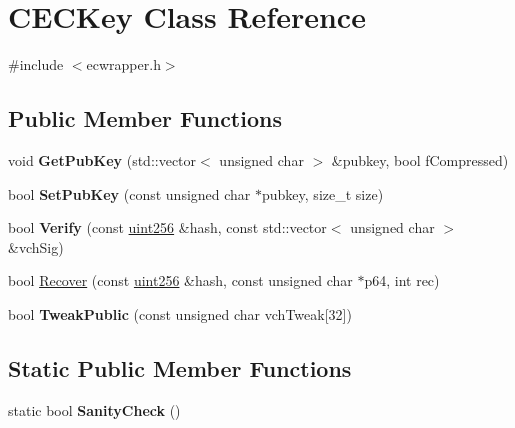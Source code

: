 \hypertarget{class_c_e_c_key}{}\section{C\+E\+C\+Key Class Reference}
\label{class_c_e_c_key}


{\ttfamily \#include $<$ecwrapper.\+h$>$}

\subsection*{Public Member Functions}
\begin{DoxyCompactItemize}
\item 
\mbox{\label{class_c_e_c_key_ab3cb52ca6bf3bdd55be9152a76da9112}} 
void {\bfseries Get\+Pub\+Key} (std\+::vector$<$ unsigned char $>$ \&pubkey, bool f\+Compressed)
\item 
\mbox{\label{class_c_e_c_key_a07055de929aa6e4f4b692fb2bd272fdd}} 
bool {\bfseries Set\+Pub\+Key} (const unsigned char $\ast$pubkey, size\+\_\+t size)
\item 
\mbox{\label{class_c_e_c_key_abbefe8d295d0bbed97d2709a3a534375}} 
bool {\bfseries Verify} (const \mbox{\hyperlink{classuint256}{uint256}} \&hash, const std\+::vector$<$ unsigned char $>$ \&vch\+Sig)
\item 
bool \mbox{\hyperlink{class_c_e_c_key_a5d7ed3acdc6c2798af3242cacc7b755b}{Recover}} (const \mbox{\hyperlink{classuint256}{uint256}} \&hash, const unsigned char $\ast$p64, int rec)
\item 
\mbox{\label{class_c_e_c_key_a5f6013e6314a8ca9645a49106091ad89}} 
bool {\bfseries Tweak\+Public} (const unsigned char vch\+Tweak\mbox{[}32\mbox{]})
\end{DoxyCompactItemize}
\subsection*{Static Public Member Functions}
\begin{DoxyCompactItemize}
\item 
\mbox{\label{class_c_e_c_key_a3d11821aa2328baf3bd684e5c1835314}} 
static bool {\bfseries Sanity\+Check} ()
\end{DoxyCompactItemize}


